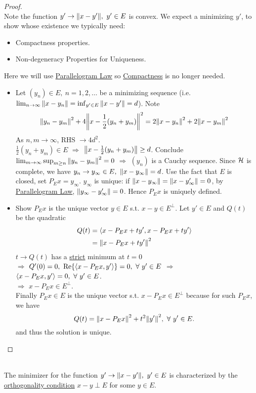 \begin{proof}\ \\
Note the function $y' \to \norm{x - y'},\ y' \in E$ is convex. We expect a minimizing $y'$, to show whose existence we typically need:
\begin{itemize}
    \item Compactness properties.
    \item Non-degeneracy Properties for Uniqueness.
\end{itemize}
Here we will use \underline{Parallelogram Law} so \underline{Compactness} is no longer needed.
\begin{itemize}
    \item Let $(y_n) \in E,\ n=1,2,\dots$ be a minimizing sequence (i.e. $\lim_{n \to \infty} \norm{x - y_n} = \inf_{y' \in E} \norm{x - y'} = d$). Note
\begin{equation*}
    \norm{y_n - y_m}^2 + 4 \norm{x - \frac{1}{2} (y_n + y_m)}^2 = 2 \norm{x - y_n}^2 + 2 \norm{x - y_m}^2
\end{equation*}
As $n,m \to \infty$, RHS $\to 4d^2$. \\
$\frac{1}{2} (y_n + y_m) \in E$ $\Rightarrow$ $\norm{x - \frac{1}{2} (y_n + y_m)} \geq d$. Conclude $\lim_{m\to \infty} \sup_{m \geq n} \norm{y_n - y_m}^2 = 0$ $\Rightarrow$ $(y_n)$ is a Cauchy sequence. Since $\mathcal{H}$ is complete, we have $y_n \to y_\infty \in E,\ \norm{x - y_\infty} = d$. Use the fact that $E$ is closed, set $P_E x = y_\infty$. $y_\infty$ is unique: if $\norm{x - y_\infty} = \norm{x - y_\infty'} = 0$, by \underline{Parallelogram Law}, $\norm{y_\infty - y_\infty'} = 0$. Hence $P_E x$ is uniquely defined.
    \item Show $P_E x$ is the unique vector $y \in E$ s.t. $x - y \in E^\perp$. Let $y' \in E$ and $Q(t)$ be the quadratic
    \begin{align*}
        Q(t) &= \left\langle x - P_E x + ty', x - P_E x + t y' \right\rangle \\&= \norm{x - P_E x + ty'}^2
    \end{align*}
    $t \to Q(t)$ has a \underline{strict} minimum at $t = 0$\\ 
    $\Rightarrow$ $Q'(0) = 0,\ \Re{\inprod{x - P_E x}{y'}} = 0,\ \forall\ y' \in E$ $\Rightarrow$ $\left\langle x - P_E x, y' \right\rangle = 0,\ \forall\ y' \in E$.\\
    $\Rightarrow$ $x - P_E x \in E^\perp$.\\
    Finally $P_E x \in E$ is the unique vector s.t. $x - P_E x \in E^\perp$ because for such $P_E x$, we have 
    \begin{equation*}
        Q(t) = \norm{x - P_E x}^2 + t^2 \norm{y'}^2,\ \forall\ y' \in E.
    \end{equation*}
    and thus the solution is unique.
\end{itemize}
\end{proof}
\begin{remark}\ \\
    The minimizer for the function $y' \to \norm{x - y'},\ y' \in E$ is characterized by the \underline{orthogonality condition} $x - y \perp E$ for some $y \in E$.
\end{remark}

